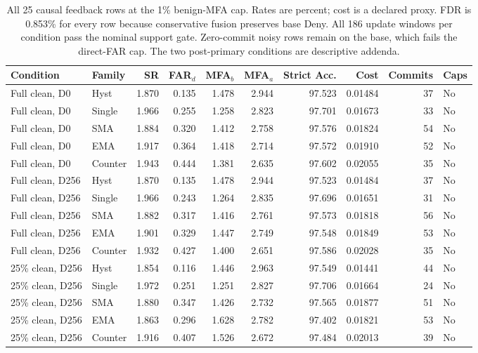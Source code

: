 \begin{table}[!htbp]
\centering
\caption{All 25 causal feedback rows at the 1\% benign-MFA cap. Rates are percent; cost is a declared proxy. FDR is 0.853\% for every row because conservative fusion preserves base Deny. All 186 update windows per condition pass the nominal support gate. Zero-commit noisy rows remain on the base, which fails the direct-FAR cap. The two post-primary conditions are descriptive addenda.}
\label{tab:supp_dynamic_1}
\scriptsize
\setlength{\tabcolsep}{3pt}
\begin{tabular}{llrrrrrrrl}
\toprule
Condition & Family & SR & FAR$_d$ & MFA$_b$ & MFA$_a$ & Strict Acc. & Cost & Commits & Caps\\
\midrule
Full clean, D0 & Hyst & 1.870 & 0.135 & 1.478 & 2.944 & 97.523 & 0.01484 & 37 & No \\
Full clean, D0 & Single & 1.966 & 0.255 & 1.258 & 2.823 & 97.701 & 0.01673 & 33 & No \\
Full clean, D0 & SMA & 1.884 & 0.320 & 1.412 & 2.758 & 97.576 & 0.01824 & 54 & No \\
Full clean, D0 & EMA & 1.917 & 0.364 & 1.418 & 2.714 & 97.572 & 0.01910 & 52 & No \\
Full clean, D0 & Counter & 1.943 & 0.444 & 1.381 & 2.635 & 97.602 & 0.02055 & 35 & No \\
Full clean, D256 & Hyst & 1.870 & 0.135 & 1.478 & 2.944 & 97.523 & 0.01484 & 37 & No \\
Full clean, D256 & Single & 1.966 & 0.243 & 1.264 & 2.835 & 97.696 & 0.01651 & 31 & No \\
Full clean, D256 & SMA & 1.882 & 0.317 & 1.416 & 2.761 & 97.573 & 0.01818 & 56 & No \\
Full clean, D256 & EMA & 1.901 & 0.329 & 1.447 & 2.749 & 97.548 & 0.01849 & 53 & No \\
Full clean, D256 & Counter & 1.932 & 0.427 & 1.400 & 2.651 & 97.586 & 0.02028 & 35 & No \\
25\% clean, D256 & Hyst & 1.854 & 0.116 & 1.446 & 2.963 & 97.549 & 0.01441 & 44 & No \\
25\% clean, D256 & Single & 1.972 & 0.251 & 1.251 & 2.827 & 97.706 & 0.01664 & 24 & No \\
25\% clean, D256 & SMA & 1.880 & 0.347 & 1.426 & 2.732 & 97.565 & 0.01877 & 51 & No \\
25\% clean, D256 & EMA & 1.863 & 0.296 & 1.628 & 2.782 & 97.402 & 0.01821 & 53 & No \\
25\% clean, D256 & Counter & 1.916 & 0.407 & 1.526 & 2.672 & 97.484 & 0.02013 & 39 & No \\

\end{tabular}
\end{table}
